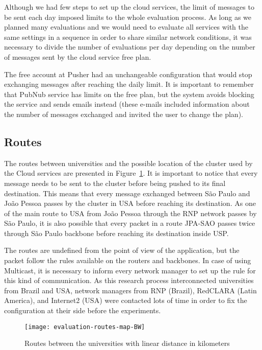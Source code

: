 Although we had few steps to set up the cloud services, the limit of messages to be sent each day imposed limits to the whole evaluation process.
As long as we planned many evaluations and we would need to evaluate all services with the same settings in a sequence in order to share similar network conditions, it was necessary to divide the number of evaluations per day depending on the number of messages sent by the cloud service free plan.

The free account at Pusher had an unchangeable configuration that would stop exchanging messages after reaching the daily limit.
It is important to remember that PubNub service has limits on the free plan, but the system avoids blocking the service and sends emails instead (these e-mails included information about the number of messages exchanged and invited the user to change the plan).

\subsection*{Routes}

The routes between universities and the possible location of the cluster used by the Cloud services are presented in Figure~\ref{fig:routes}.
It is important to notice that every message needs to be sent to the cluster before being pushed to its final destination.
This means that every message exchanged between S\~{a}o Paulo and Jo\~{a}o Pessoa passes by the cluster in USA before reaching its destination.
As one of the main route to USA from Jo\~{a}o Pessoa through the RNP network passes by S\~{a}o Paulo, it is also possible that every packet in a route JPA-SAO passes twice through  S\~{a}o Paulo backbone before reaching its destination inside USP.

The routes are undefined from the point of view of the application, but the packet follow the rules available on the routers and backbones.
In case of using Multicast, it is necessary to inform every network manager to set up the rule for this kind of communication.
As this research process interconnected universities from Brazil and USA, network managers from RNP (Brazil), RedCLARA (Latin America), and Internet2 (USA) were contacted lots of time in order to fix the configuration at their side before the experiments.

\begin{figure}[!ht]
	\centering
	\texttt{[image: evaluation-routes-map-BW]}
	\caption{Routes between the universities with linear distance in kilometers}
	\label{fig:routes}
\end{figure}

